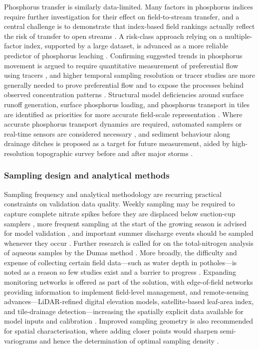 Phosphorus transfer is similarly data-limited. Many factors in phosphorus indices require further investigation for their effect on field-to-stream transfer, and a central challenge is to demonstrate that index-based field rankings actually reflect the risk of transfer to open streams \parencite{Bechmann2007}. A risk-class approach relying on a multiple-factor index, supported by a large dataset, is advanced as a more reliable predictor of phosphorus leaching \parencite{Beauchemin2003}. Confirming suggested trends in phosphorus movement is argued to require quantitative measurement of preferential flow using tracers \parencite{Salazar2011}, and higher temporal sampling resolution or tracer studies are more generally needed to prove preferential flow and to expose the processes behind observed concentration patterns \parencite{Tiemeyer2009}. Structural model deficiencies around surface runoff generation, surface phosphorus loading, and phosphorus transport in tiles are identified as priorities for more accurate field-scale representation \parencite{Apostel2021}. Where accurate phosphorus transport dynamics are required, automated samplers or real-time sensors are considered necessary \parencite{Dialameh2022}, and sediment behaviour along drainage ditches is proposed as a target for future measurement, aided by high-resolution topographic survey before and after major storms \parencite{Warsta2014}.

\subsubsection{Sampling design and analytical methods}

Sampling frequency and analytical methodology are recurring practical constraints on validation data quality. Weekly sampling may be required to capture complete nitrate spikes before they are displaced below suction-cup samplers \parencite{Zotarelli2007}, more frequent sampling at the start of the growing season is advised for model validation \parencite{Kalita1998}, and important summer discharge events should be sampled whenever they occur \parencite{Tiemeyer2009}. Further research is called for on the total-nitrogen analysis of aqueous samples by the Dumas method \parencite{Schindler1999}. More broadly, the difficulty and expense of collecting certain field data---such as water depth in potholes---is noted as a reason so few studies exist and a barrier to progress \parencite{Upadhyay2019}. Expanding monitoring networks is offered as part of the solution, with edge-of-field networks providing information to implement field-level management, and remote-sensing advances---LiDAR-refined digital elevation models, satellite-based leaf-area index, and tile-drainage detection---increasing the spatially explicit data available for model inputs and calibration \parencite{Apostel2021}. Improved sampling geometry is also recommended for spatial characterisation, where adding closer points would sharpen semi-variograms and hence the determination of optimal sampling density \parencite{GALLICHAND1992}.

